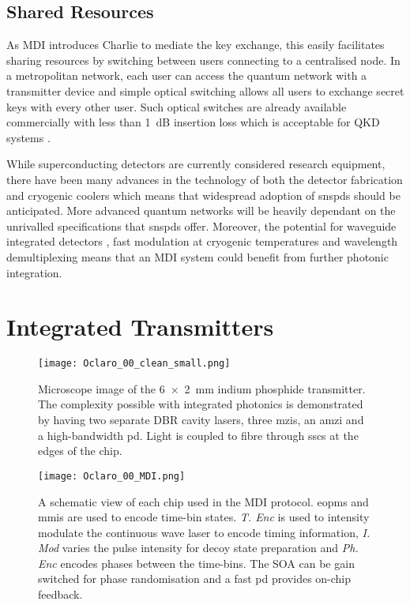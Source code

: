 \subsection{Shared Resources}

As \ac{MDI} introduces Charlie to mediate the key exchange, this easily facilitates sharing resources by switching between users connecting to a centralised node. In a metropolitan network, each user can access the quantum network with a transmitter device and simple optical switching allows all users to exchange secret keys with every other user. Such optical switches are already available commercially with less than \SI{1}{dB} insertion loss which is acceptable for \ac{QKD} systems \cite{polatis}. 

While superconducting detectors are currently considered research equipment, there have been many advances in the technology of both the detector fabrication and cryogenic coolers which means that widespread adoption of \acp{snspd} should be anticipated. More advanced quantum networks will be heavily dependant on the unrivalled specifications that \acp{snspd} offer. Moreover, the potential for waveguide integrated detectors \cite{sprengers2011, vetter2016, yun2019}, fast modulation at cryogenic temperatures \cite{eltes2019} and wavelength demultiplexing \cite{sugita2000} means that an \ac{MDI} system could benefit from further photonic integration. 

\section{Integrated Transmitters}

\begin{figure}[t]
	\centering
	\texttt{[image: Oclaro\_00\_clean\_small.png]}
	\caption[Microscope image of the InP QKD transmitter devices]{Microscope image of the \SI{6x2}{mm} indium phosphide transmitter. The complexity possible with integrated photonics is demonstrated by having two separate \ac{DBR} cavity lasers, three \acfp{mzi}, an \ac{amzi} and a high-bandwidth \acf{pd}. Light is coupled to fibre through \acfp{ssc} at the edges of the chip.}
	\label{fig:oclaro_00}
\end{figure}

\begin{figure}[t]
	\texttt{[image: Oclaro\_00\_MDI.png]}
	\caption[InP transmitter schematic for BB84 state generation]{A schematic view of each chip used in the \acs{MDI} protocol. \Acfp{eopm} and \acfp{mmi} are used to encode time-bin states. \textit{T. Enc} is used to intensity modulate the continuous wave laser to encode timing information, \textit{I. Mod} varies the pulse intensity for decoy state preparation and \textit{Ph. Enc} encodes phases between the time-bins. The \acf{SOA} can be gain switched for phase randomisation and a fast \acf{pd} provides on-chip feedback.}
	\label{fig:chip_mdi_schematic}
\end{figure}

